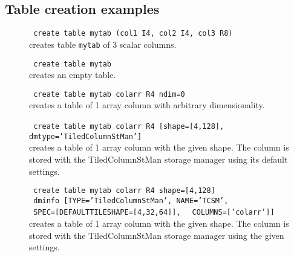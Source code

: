 \subsection{\label{TAQL:CREAEXAMPLES}Table creation examples}
\begin{description}
  \item[] \texttt{ create table mytab (col1 I4, col2 I4, col3 R8) }
      \\creates table \texttt{mytab} of 3 scalar columns.

  \item[] \texttt{ create table mytab }
      \\creates an empty table.

  \item[] \texttt{ create table mytab colarr R4 ndim=0 }
      \\creates a table of 1 array column with arbitrary dimensionality.

  \item[] \texttt{ create table mytab colarr R4 [shape=[4,128],}
          \texttt{ dmtype='TiledColumnStMan'] }
      \\creates a table of 1 array column with the given shape.
        The column is stored with the TiledColumnStMan storage manager
        using its default settings.

  \item[] \texttt{ create table mytab colarr R4 shape=[4,128] }
          \\\texttt{   dminfo [TYPE='TiledColumnStMan', NAME='TCSM', }
          \\\texttt{           SPEC=[DEFAULTTILESHAPE=[4,32,64]], }
          \texttt{           COLUMNS=['colarr']]}
      \\creates a table of 1 array column with the given shape.
        The column is stored with the TiledColumnStMan storage manager
        using the given settings.
\end{description}

